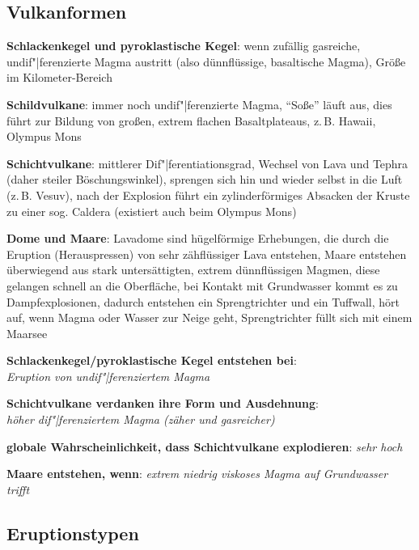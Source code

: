 \subsection{%
    Vulkanformen%
}

\textbf{Schlackenkegel und pyroklastische Kegel}:
wenn zufällig gasreiche, undif"|ferenzierte Magma austritt
(also dünnflüssige, basaltische Magma),
Größe im Kilometer-Bereich

\textbf{Schildvulkane}:
immer noch undif"|ferenzierte Magma,
"`Soße"' läuft aus,
dies führt zur Bildung von großen, extrem flachen Basaltplateaus,
z.\,B. Hawaii, Olympus Mons

\textbf{Schichtvulkane}:
mittlerer Dif"|ferentiationsgrad,
Wechsel von Lava und Tephra (daher steiler Böschungswinkel),
sprengen sich hin und wieder selbst in die Luft (z.\,B. Vesuv),
nach der Explosion führt ein zylinderförmiges Absacken der Kruste zu einer sog. Caldera
(existiert auch beim Olympus Mons)

\textbf{Dome und Maare}:
Lavadome sind hügelförmige Erhebungen, die durch die Eruption (Herauspressen) von
sehr zähflüssiger Lava entstehen,
Maare entstehen überwiegend aus stark untersättigten, extrem dünnflüssigen Magmen,
diese gelangen schnell an die Oberfläche,
bei Kontakt mit Grundwasser kommt es zu Dampfexplosionen,
dadurch entstehen ein Sprengtrichter und ein Tuffwall,
hört auf, wenn Magma oder Wasser zur Neige geht,
Sprengtrichter füllt sich mit einem Maarsee

\begin{wichtig}
    \item
    \textbf{Schlackenkegel/pyroklastische Kegel entstehen bei}:\\
    \emph{Eruption von undif"|ferenziertem Magma}
    
    \item
    \textbf{Schichtvulkane verdanken ihre Form und Ausdehnung}:\\
    \emph{höher dif"|ferenziertem Magma (zäher und gasreicher)}
    
    \item
    \textbf{globale Wahrscheinlichkeit, dass Schichtvulkane explodieren}:
    \emph{sehr hoch}
    
    \item
    \textbf{Maare entstehen, wenn}:
    \emph{extrem niedrig viskoses Magma auf Grundwasser trifft}
\end{wichtig}

\pagebreak

\subsection{%
    Eruptionstypen%
}

